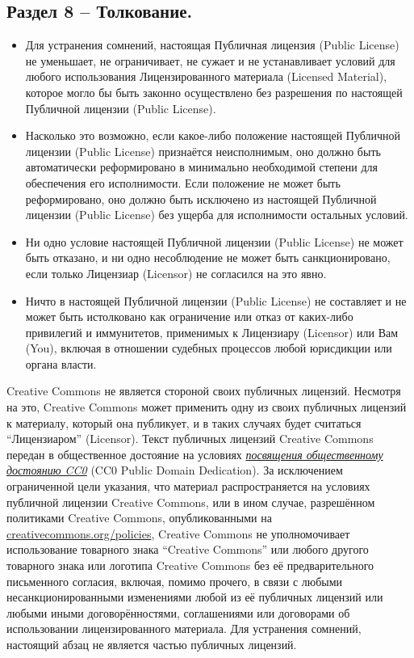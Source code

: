 \subsection*{Раздел 8 -- Толкование.}
\begin{itemize}
\item[a.] Для устранения сомнений, настоящая Публичная лицензия (Public License) не уменьшает, не ограничивает, не сужает и не устанавливает условий для любого использования Лицензированного материала (Licensed Material), которое могло бы быть законно осуществлено без разрешения по настоящей Публичной лицензии (Public License).
\item[b.] Насколько это возможно, если какое-либо положение настоящей Публичной лицензии (Public License) признаётся неисполнимым, оно должно быть автоматически реформировано в минимально необходимой степени для обеспечения его исполнимости. Если положение не может быть реформировано, оно должно быть исключено из настоящей Публичной лицензии (Public License) без ущерба для исполнимости остальных условий.
\item[c.] Ни одно условие настоящей Публичной лицензии (Public License) не может быть отказано, и ни одно несоблюдение не может быть санкционировано, если только Лицензиар (Licensor) не согласился на это явно.
\item[d.] Ничто в настоящей Публичной лицензии (Public License) не составляет и не может быть истолковано как ограничение или отказ от каких-либо привилегий и иммунитетов, применимых к Лицензиару (Licensor) или Вам (You), включая в отношении судебных процессов любой юрисдикции или органа власти.
\end{itemize}

Creative Commons не является стороной своих публичных лицензий. Несмотря на это, Creative Commons может применить одну из своих публичных лицензий к материалу, который она публикует, и в таких случаях будет считаться ``Лицензиаром'' (Licensor). Текст публичных лицензий Creative Commons передан в общественное достояние на условиях \href{https://creativecommons.org/publicdomain/zero/1.0/legalcode}{\textsl{посвящения общественному достоянию CC0}} (CC0 Public Domain Dedication). За исключением ограниченной цели указания, что материал распространяется на условиях публичной лицензии Creative Commons, или в ином случае, разрешённом политиками Creative Commons, опубликованными на \href{https://creativecommons.org/policies}{creativecommons.org/policies}, Creative Commons не уполномочивает использование товарного знака ``Creative Commons'' или любого другого товарного знака или логотипа Creative Commons без её предварительного письменного согласия, включая, помимо прочего, в связи с любыми несанкционированными изменениями любой из её публичных лицензий или любыми иными договорённостями, соглашениями или договорами об использовании лицензированного материала. Для устранения сомнений, настоящий абзац не является частью публичных лицензий.


